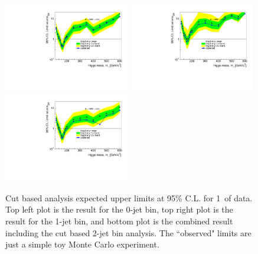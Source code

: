 \begin{figure}[!htbp]
\begin{center}
   \includegraphics[width=0.49\textwidth]{figures/limits_0j_1000pb_mva_1.pdf}
   \includegraphics[width=0.49\textwidth]{figures/limits_1j_1000pb_mva_1.pdf}
   \includegraphics[width=0.49\textwidth]{figures/limits_nj_1000pb_mva_1.pdf}
   \caption{Cut based analysis expected upper limits at 95\% C.L. for 1\ifb\ of data. Top left plot 
   is the result for the 0-jet bin, top right plot is the result for the 1-jet bin, and 
   bottom plot is the combined result including the cut based 2-jet bin analysis. The ``observed" limits 
   are just a simple toy Monte Carlo experiment.}
   \label{fig:mvabase_uls}
\end{center}
\end{figure}
